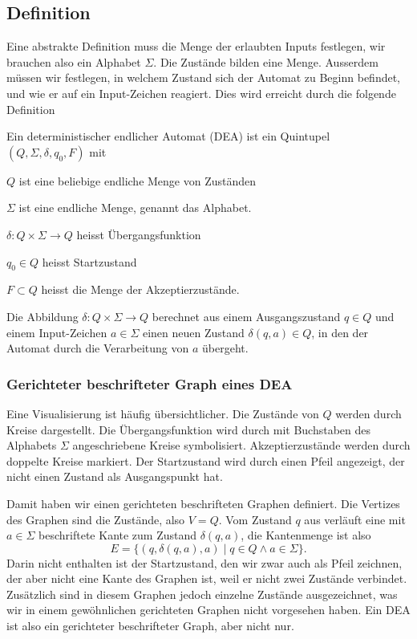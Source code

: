 \subsection{Definition\label{regulaer:definition-dea}}
Eine abstrakte Definition muss die Menge der erlaubten Inputs
festlegen, wir brauchen also ein Alphabet $\Sigma$.
Die Zustände bilden eine Menge.
Ausserdem müssen wir festlegen, in welchem Zustand
sich der Automat zu Beginn befindet, und wie er auf ein Input-Zeichen
reagiert.
Dies wird erreicht durch die folgende Definition
\begin{definition}
Ein deterministischer endlicher Automat (DEA) ist ein Quintupel
$(Q,\Sigma,\delta, q_0,F)$ mit
\begin{compactenum}
\item $Q$ ist eine beliebige endliche Menge von Zuständen
\item $\Sigma$ ist eine endliche Menge, genannt das Alphabet.
\item $\delta\colon Q\times\Sigma\to Q$ heisst Übergangsfunktion
\item $q_0\in Q$ heisst Startzustand
\item $F\subset Q$ heisst die Menge der Akzeptierzustände.
\end{compactenum}
\end{definition}
Die Abbildung $\delta\colon Q\times \Sigma\to Q$ berechnet
aus einem Ausgangszustand $q\in Q$ und einem Input-Zeichen $a\in\Sigma$
einen neuen Zustand $\delta(q,a)\in Q$, in den der Automat durch
die Verarbeitung von $a$ übergeht.

\subsubsection{Gerichteter beschrifteter Graph eines DEA}
Eine Visualisierung ist häufig übersichtlicher.
Die Zustände von $Q$ werden durch Kreise dargestellt.
Die Übergangsfunktion wird durch mit Buchstaben des Alphabets $\Sigma$
angeschriebene Kreise symbolisiert.
Akzeptierzustände werden durch doppelte Kreise markiert.
Der Startzustand wird durch einen
Pfeil angezeigt, der nicht einen Zustand als Ausgangspunkt hat.

Damit haben wir einen gerichteten beschrifteten Graphen definiert.
Die Vertizes des Graphen sind die Zustände, also $V=Q$.
Vom Zustand $q$ aus verläuft eine mit $a\in\Sigma$ beschriftete
Kante zum Zustand $\delta(q,a)$, 
die Kantenmenge
ist also
\[
E=\{(q,\delta(q,a),a)\;|\; q\in Q\wedge a\in\Sigma\}.
\]
Darin nicht enthalten ist der Startzustand, den wir zwar auch als
Pfeil zeichnen, der aber nicht eine Kante des Graphen ist, weil
er nicht zwei Zustände verbindet.
Zusätzlich sind in diesem Graphen jedoch einzelne Zustände ausgezeichnet,
was wir in einem gewöhnlichen gerichteten Graphen nicht vorgesehen
haben.
Ein DEA ist also ein gerichteter beschrifteter Graph, aber nicht
nur.

